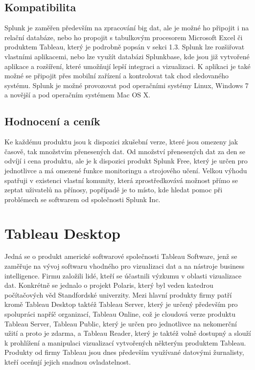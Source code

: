 \documentclass[czech,BP]{thesiskiv}
\begin{document}
\subsection{Kompatibilita}
Splunk je zaměřen především na zpracování big dat, ale je možné ho připojit i na relační databáze, nebo ho propojit s tabulkovým procesorem Microsoft Excel či produktem Tableau, který je podrobně popsán v sekci 1.3. Splunk lze rozšiřovat vlastními aplikacemi, nebo lze využít databázi Splunkbase, kde jsou již vytvořené aplikace a rozšíření, které umožňují lepší integraci a vizualizaci. K aplikaci je také možné se připojit přes mobilní zařízení a kontrolovat tak chod sledovaného systému. Splunk je možné provozovat pod operačními systémy Linux, Windows 7 a novější a pod operačním systémem Mac OS X. \cite{Splunk_a_kompatibilita}

\subsection{Hodnocení a ceník}
 Ke každému produktu jsou k dispozici zkušební verze, které jsou omezeny jak časově, tak množstvím přenesených dat. Od množství přenesených dat za den se odvíjí i cena produktu, ale je k dispozici produkt Splunk Free, který je určen pro jednotlivce a má omezené funkce monitoringu a strojového učení. Velkou výhodu spatřuji v existenci vlastní komunity, která zprostředkovává možnost přímo se zeptat uživatelů na přínosy, popřípadě je to místo, kde hledat pomoc při problémech se softwarem od společnosti Splunk Inc.
 
 
 \section{Tableau Desktop}
 Jedná se o produkt americké softwarové společnosti Tableau Software, jenž se zaměřuje na vývoj softwaru vhodného pro vizualizaci dat a na nástroje business intelligence. Firmu založili lidé, kteří se účastnili výzkumu v oblasti vizualizace dat. Konkrétně se jednalo o projekt Polaris, který byl veden katedrou počítačových věd Standfordské univerzity.\cite{TableauHistory} Mezi hlavní produkty firmy patří kromě Tableau Desktop taktéž Tableau Server, který je určený především pro spolupráci napříč organizací, Tableau Online, což je cloudová verze produktu Tableau Server, Tableau Public, který je určen pro jednotlivce na nekomerční užití a proto je zdarma, a Tableau Reader, který je taktéž volně dostupný a slouží k prohlížení a manipulaci vizualizací vytvořených některým produktem Tableau. Produkty od firmy Tableau jsou dnes především využívané datovými žurnalisty, kteří oceňují jejich snadnou ovladatelnost.
 
\end{document}
